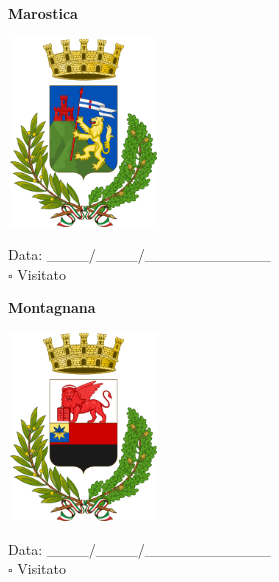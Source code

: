 \documentclass[a5paper,12pt]{article}
\begin{document}
\vspace{0.7cm}

\noindent
\begin{minipage}[t]{0.45\textwidth}
    \begin{center}
        \textbf{Marostica}
    \end{center}
    \vspace{-0.5cm} %
    \begin{center}
        \includegraphics[height= 5cm, width=4cm]{Veneto/Stemma Marostica.png}
    \end{center}
    \vspace{-0.4cm} %
    \begin{flushleft}
        Data: \_\_\_\_/\_\_\_\_/\_\_\_\_\_\_\_\_\_\_\_\_ \\
        $\square$ Visitato
    \end{flushleft}
\end{minipage}
\hfill
\noindent
\begin{minipage}[t]{0.45\textwidth}
    \begin{center}
        \textbf{Montagnana}
    \end{center}
    \vspace{-0.5cm} %
    \begin{center}
        \includegraphics[height= 5cm, width=4cm]{Veneto/Stemma Montagnana.png}
    \end{center}
    \vspace{-0.4cm} %
    \begin{flushleft}
        Data: \_\_\_\_/\_\_\_\_/\_\_\_\_\_\_\_\_\_\_\_\_ \\
        $\square$ Visitato
    \end{flushleft}
\end{minipage}
\end{document}
